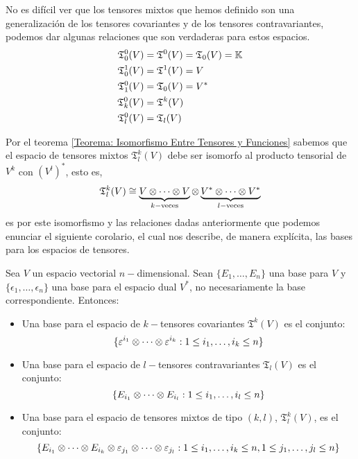 No es difícil ver que los tensores mixtos que hemos definido son una
generalización de los tensores covariantes y de los tensores contravariantes,
podemos dar algunas relaciones que son verdaderas para estos espacios.
\begin{align*}
	\mathfrak{T}_{0}^{0}(V) & = \mathfrak{T}^{0}(V) = \mathfrak{T}_{0}(V) = \mathbb{K} \\
	\mathfrak{T}_{0}^{1}(V) & = \mathfrak{T}^{1}(V) = V                        \\
	\mathfrak{T}_{1}^{0}(V) & = \mathfrak{T}_{0}(V) = V^{*}                    \\
	\mathfrak{T}_{k}^{0}(V) & = \mathfrak{T}^{k}(V)                            \\
	\mathfrak{T}_{l}^{0}(V) & = \mathfrak{T}_{l}(V)
\end{align*}

Por el teorema \ref{Teorema: Isomorfismo Entre Tensores y Funciones} sabemos que
el espacio de tensores mixtos $\mathfrak{T}_{l}^{k}(V)$ debe ser isomorfo al
producto tensorial de $V^k$ con $(V^l)^*$, esto es,
\[
	\mathfrak{T}_{l}^{k}(V) \cong \underbrace{V \otimes \cdots \otimes V}_{k-\text{veces}}
	\otimes \underbrace{V^* \otimes \cdots \otimes V^*}_{l-\text{veces}}
\]
es por este isomorfismo y las relaciones dadas anteriormente que podemos
enunciar el siguiente corolario, el cual nos describe, de manera explícita, las
bases para los espacios de tensores.

\begin{corollary}
	Sea $V$ un espacio vectorial $n-$dimensional. Sean $\{E_1, \ldots, E_n\}$ una
	base para $V$ y $\{\epsilon_1, \ldots, \epsilon_n\}$ una base para el espacio
	dual $V^{*}$, no necesariamente la base correspondiente. Entonces:
	\begin{itemize}
		\item Una base para el espacio de $k-$tensores covariantes
		      $\mathfrak{T}^{k}(V)$ es el conjunto:
		      \[
			      \{\varepsilon^{i_1} \otimes \cdots \otimes \varepsilon^{i_k}: 1 \leq i_1 ,\ldots,
			      i_k \leq n\}
		      \]
		\item Una base para el espacio de $l-$tensores contravariantes
		      $\mathfrak{T}_l(V)$ es el conjunto:
		      \[
			      \{E_{i_1} \otimes \cdots \otimes E_{i_l}: 1 \leq i_1, \ldots, i_l \leq n\}
		      \]
		\item Una base para el espacio de tensores mixtos de tipo $(k,l)$,
		      $\mathfrak{T}_{l}^{k}(V)$, es el conjunto:
		      \[
			      \{E_{i_1} \otimes \cdots \otimes E_{i_k} \otimes \varepsilon_{j_1} \otimes \cdots \otimes
			      \varepsilon_{j_l}: 1 \leq i_1, \ldots, i_k \leq n, 1 \leq j_1, \ldots,
			      j_l \leq n\}
		      \]
	\end{itemize}
\end{corollary}

